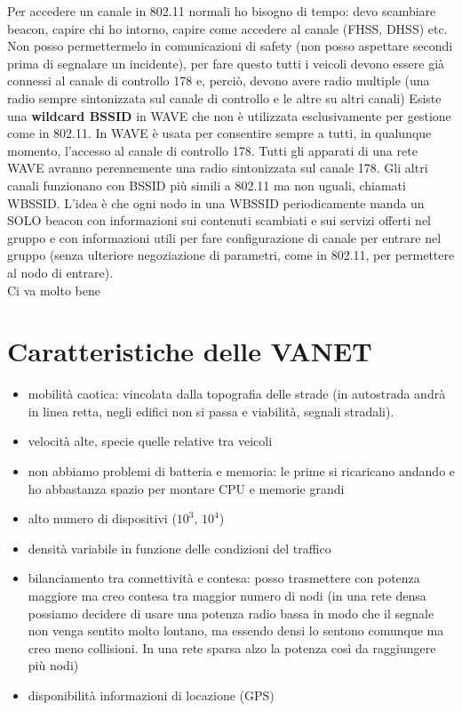 \documentclass[12pt,italian]{report}
\begin{document}
Per accedere un canale in 802.11 normali ho bisogno di tempo: devo scambiare beacon, capire chi ho intorno, capire come accedere al canale (FHSS, DHSS) etc. Non posso permettermelo in comunicazioni di safety (non posso aspettare secondi prima di segnalare un incidente), per fare questo tutti i veicoli devono essere già connessi al canale di controllo 178 e, perciò, devono avere radio multiple (una radio sempre sintonizzata sul canale di controllo e le altre su altri canali)
\bigbreak
Esiste una \textbf{wildcard BSSID} in WAVE che non è utilizzata esclusivamente per gestione come in 802.11. In WAVE è usata per consentire sempre a tutti, in qualunque momento, l'accesso al canale di controllo 178. Tutti gli apparati di una rete WAVE avranno perennemente una radio sintonizzata sul canale 178. 
\bigbreak
Gli altri canali funzionano con BSSID più simili a 802.11 ma non uguali, chiamati WBSSID. L'idea è che ogni nodo in una WBSSID periodicamente manda un SOLO beacon con informazioni sui contenuti scambiati e sui servizi offerti nel gruppo e con informazioni utili per fare configurazione di canale per entrare nel gruppo (senza ulteriore negoziazione di parametri, come in 802.11, per permettere al nodo di entrare).\\ Ci va molto bene 

\section{Caratteristiche delle VANET}
\begin{itemize}
    \item mobilità caotica: vincolata dalla topografia delle strade (in autostrada andrà in linea retta, negli edifici non si passa e viabilità, segnali stradali). 
    \item velocità alte, specie quelle relative tra veicoli
    \item non abbiamo problemi di batteria e memoria: le prime si ricaricano andando e ho abbastanza spazio per montare CPU e memorie grandi
    \item alto numero di dispositivi ($10^3$, $10^4$)
    \item densità variabile in funzione delle condizioni del traffico
    \item bilanciamento tra connettività e contesa: posso trasmettere con potenza maggiore ma creo contesa tra maggior numero di nodi (in una rete densa possiamo decidere di usare una potenza radio bassa in modo che il segnale non venga sentito molto lontano, ma essendo densi lo sentono comunque ma creo meno collisioni. In una rete sparsa alzo la potenza così da raggiungere più nodi)
    \item disponibilità informazioni di locazione (GPS)
\end{itemize}
\end{document}

